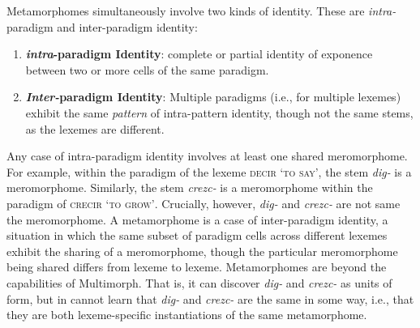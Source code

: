 	Metamorphomes simultaneously involve two kinds of identity. These are \emph{intra-}paradigm and {inter-}paradigm identity: 
	\begin{enumerate}
		\item \textbf{\emph{intra}-paradigm Identity}: complete or partial identity of exponence between two or more cells of the same paradigm. 
		\item \textbf{\emph{Inter-}paradigm Identity}: Multiple paradigms (i.e., for multiple lexemes) exhibit the same \emph{pattern} of intra-pattern identity, though not the same stems, as the lexemes are different.
	\end{enumerate} 
Any case of intra-paradigm identity involves at least one shared 
meromorphome. For example, within the paradigm of the lexeme 
\textsc{decir} \textsc{`to say'}, 
the stem \textit{dig-} is a meromorphome. Similarly, the stem \textit{crezc-} 
is a meromorphome within the paradigm of 
\textsc{crecir} \textsc{`to grow'}. Crucially, however, 
\textit{dig-} and \textit{crezc-} are not same the meromorphome. 
A metamorphome is a case of inter-paradigm identity, a situation 
in which the same subset of 
paradigm cells across different lexemes exhibit the sharing of a meromorphome, 
though the particular meromorphome being shared differs from lexeme to 
lexeme. 
Metamorphomes are beyond the capabilities of Multimorph. 
That is, it can discover \textit{dig-} and \textit{crezc-} as units of form, 
but in cannot learn that \textit{dig-} and \textit{crezc-} are the same 
in some way, i.e., that they are both lexeme-specific instantiations of the
same metamorphome.

